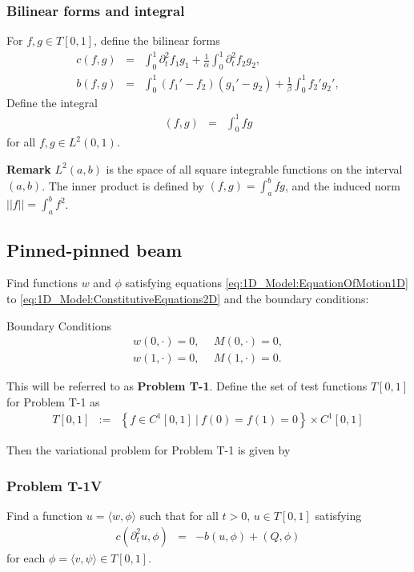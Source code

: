 			\subsubsection*{Bilinear forms and integral}
				For $f,g \in T[0,1]$, define the bilinear forms
				\begin{eqnarray}
					c(f,g) & = & \int_0^1  \partial_t^2 f_1 g_1 + \frac{1}{\alpha}\int_0^1  \partial_t^2 f_2g_2, \label{eq:1D_Model:Bilinear} \\
					b(f,g) & = &   \int_0^1 (f_1'-f_2)(g_1' - g_2) + \frac{1}{\beta}\int_0^1 f_2' g_2', \label{eq:1D_Model:Bilinear_c}
				\end{eqnarray}
				Define the integral
				\begin{eqnarray}
				(f,g)
					&=& \int_{0}^1 fg \label{eq:1D_Model:Bilinear_int}
				\end{eqnarray} for all $f,g \in L^2(0,1).$

				\textbf{Remark}
				$L^2(a,b)$ is the space of all square integrable functions on the interval $(a,b)$. The inner product is defined by $\displaystyle (f,g) = \int_a^b fg$, and the induced norm $\displaystyle ||f|| = \int_a^b f^2$.\\

			\subsection*{Pinned-pinned beam}
				Find functions $w$ and $\phi$ satisfying equations \eqref{eq:1D_Model:EquationOfMotion1D} to \eqref{eq:1D_Model:ConstitutiveEquations2D} and the boundary conditions:

				{Boundary Conditions}
				\begin{eqnarray*}
					w(0,\cdot) = 0, \ \ &M(0,\cdot) = 0, \label{eq:1D_Model:ProblemT1BC1}\\
					w(1,\cdot) = 0, \ \ &M(1,\cdot) = 0. \label{eq:1D_Model:ProblemT1BC2}
				\end{eqnarray*}

				This will be referred to as \textbf{Problem T-1}. Define the set of test functions $T[0,1]$ for Problem T-1 as
				\begin{eqnarray*}
					T[0,1] &:=&  \left\{f \in C^1[0,1] \ | \ f(0) = f(1) = 0 \right\} \times C^1[0,1]
				\end{eqnarray*}

				Then the variational problem for Problem T-1 is given by
				\subsubsection*{Problem T-1V}\label{sssec:1D_Model:ProblemT1V}
					Find a function ${u} = \langle w, \phi \rangle$ such that for all $t >0$, ${u} \in  T[0,1]$ satisfying
					\begin{eqnarray}
						c(\partial_t^2 u,{\phi}) &=& -b({u},{\phi}) + (Q,{\phi})
					\end{eqnarray} for each ${\phi} = \langle v, \psi \rangle \in T[0,1]$.

